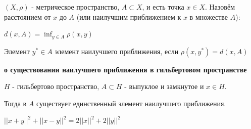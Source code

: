 \begin{definition}
    $(X, \rho)$ - метрическое пространство, $A \subset X$, и есть точка $x \in X$. Назовём расстоянием от $x$ до $A$ (или наилучшим приближением к $x$ в множестве $A$):
    
    $d(x, A) = \inf_{y \in A} \rho (x, y)$ 
\end{definition}

\begin{definition}
    Элемент $y^{*} \in A$ элемент наилучшего приближения, если $\rho (x, y^*) = d(x, A)$
\end{definition}

\begin{theorem}
    \textbf{о существовании наилучшего приближения в гильбертовом пространстве}

    $H$ - гильбертово пространство, $A \subset H$ - выпуклое и замкнутое и $x \in H$.

    Тогда в $A$ существует единственный элемент наилучшего приближения.
\end{theorem}

\begin{lemma}
    $||x + y||^2 + ||x - y||^2 = 2||x||^2 + 2||y||^2 $
\end{lemma}

